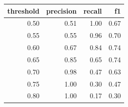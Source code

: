 \begin{tabular}{rrrr}
\toprule
threshold & precision & recall & f1 \\
\midrule
0.50 & 0.51 & 1.00 & 0.67 \\
0.55 & 0.55 & 0.96 & 0.70 \\
0.60 & 0.67 & 0.84 & 0.74 \\
0.65 & 0.85 & 0.65 & 0.74 \\
0.70 & 0.98 & 0.47 & 0.63 \\
0.75 & 1.00 & 0.30 & 0.47 \\
0.80 & 1.00 & 0.17 & 0.30 \\
\bottomrule
\end{tabular}
